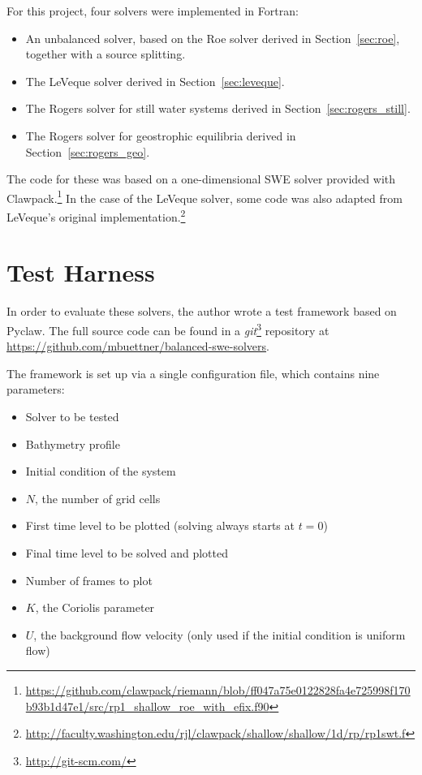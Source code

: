 For this project, four solvers were implemented in Fortran:

\begin{itemize}
  \item An unbalanced solver, based on the Roe solver derived in Section~\ref{sec:roe}, together with a source splitting.
  \item The LeVeque solver derived in Section~\ref{sec:leveque}.
  \item The Rogers solver for still water systems derived in Section~\ref{sec:rogers_still}.
  \item The Rogers solver for geostrophic equilibria derived in Section~\ref{sec:rogers_geo}.
\end{itemize}

The code for these was based on a one-dimensional SWE solver provided with Clawpack.\footnote{\url{https://github.com/clawpack/riemann/blob/ff047a75e0122828fa4e725998f170b93b1d47e1/src/rp1_shallow_roe_with_efix.f90}} In the case of the LeVeque solver, some code was also adapted from LeVeque's original implementation.\footnote{\url{http://faculty.washington.edu/rjl/clawpack/shallow/shallow/1d/rp/rp1swt.f}}

\section{Test Harness}

In order to evaluate these solvers, the author wrote a test framework based on Pyclaw. The full source code can be found in a \emph{git}\footnote{\url{http://git-scm.com/}} repository at \url{https://github.com/mbuettner/balanced-swe-solvers}.

The framework is set up via a single configuration file, which contains nine parameters:

\begin{itemize}
  \item Solver to be tested
  \item Bathymetry profile
  \item Initial condition of the system
  \item $N$, the number of grid cells
  \item First time level to be plotted (solving always starts at $t = 0$)
  \item Final time level to be solved and plotted
  \item Number of frames to plot
  \item $K$, the Coriolis parameter
  \item $U$, the background flow velocity (only used if the initial condition is uniform flow)
\end{itemize}

